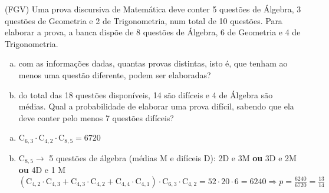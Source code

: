 \begin{ex}
(FGV) Uma prova discursiva de Matemática deve conter 5 questões de Álgebra, 3 questões de Geometria e 2 de Trigonometria, num total de 10 questões. Para elaborar a prova, a banca dispõe de 8 questões de Álgebra, 6 de Geometria e 4 de Trigonometria. 
   \begin{enumerate}[(a)]
   \item com as informações dadas, quantas provas distintas, isto é, que tenham ao menos uma questão diferente, podem ser elaboradas?
   \item do total das 18 questões disponíveis, 14 são difíceis e 4 de Álgebra são médias. Qual a probabilidade de elaborar uma prova difícil, sabendo que ela deve conter pelo menos 7 questões difíceis?
   \end{enumerate}
     \begin{sol}
      \phantom{A}
        \begin{enumerate} [(a)]
            \item $\mathrm{C}_{6,3}\cdot\mathrm{C}_{4,2}\cdot\mathrm{C}_{8,5}=6720$
            \item $\mathrm{C}_{8,5}\rightarrow$ 5 questões de álgebra (médias M e difíceis D):
            2D e 3M \textbf{ou} 3D e 2M \textbf{ou} 4D e 1 M\\
            $(\mathrm{C}_{4,2}\cdot\mathrm{C}_{4,3}+\mathrm{C}_{4,3}\cdot\mathrm{C}_{4,2}+\mathrm{C}_{4,4}\cdot\mathrm{C}_{4,1})\cdot\mathrm{C}_{6,3}\cdot\mathrm{C}_{4,2}=52\cdot20\cdot6=6240 \Longrightarrow p=\frac{6240}{6720}=\frac{13}{14}$
        \end{enumerate}
     \end{sol}
\end{ex}